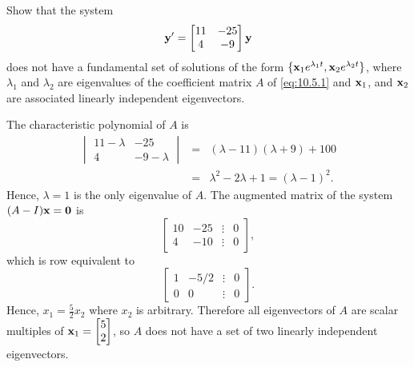 \documentclass{ximera}
\begin{document}
\begin{example}\label{example:10.5.1}
Show that the system
\begin{equation}\label{eq:10.5.1}
{\bf y}'=\begin{bmatrix}11&-25\\4&-9\end{bmatrix}{\bf y}
\end{equation}
does not have a fundamental set of solutions of the form $\{{\bf
x}_1e^{\lambda_1t},{\bf x}_2e^{\lambda_2t}\}$, where $\lambda_1$ and
$\lambda_2$ are eigenvalues of the coefficient matrix $A$ of
\eqref{eq:10.5.1} and ${\bf x}_1$, and ${\bf x}_2$ are associated
linearly independent eigenvectors.

\begin{explanation}   
The characteristic polynomial of $A$ is
\begin{eqnarray*}
\begin{vmatrix}11-\lambda&-25\\4&-9-\lambda\end{vmatrix}
&=&(\lambda-11)(\lambda+9)+100\\
&=&\lambda^2-2\lambda+1=(\lambda-1)^2.
\end{eqnarray*}
Hence, $\lambda=1$ is the only eigenvalue of $A$. The augmented
matrix of the system $(A-I){\bf x}={\bf 0}$ is
$$
\begin{bmatrix}10&-25&\vdots&0\\4&
-10&\vdots&0\end{bmatrix},
$$
which is row equivalent to
$$
\begin{bmatrix}1&-5/2&\vdots&0\\0&
0&\vdots&0\end{bmatrix}.
$$
Hence, $x_1=\frac{5}{2}x_2$ where $x_2$ is arbitrary. Therefore all
eigenvectors of $A$ are scalar multiples of ${\bf
x}_1=\begin{bmatrix}5\\2\end{bmatrix}$,
so $A$ does not have a set of two linearly independent eigenvectors.
\end{explanation}
\end{example}
\end{document}
